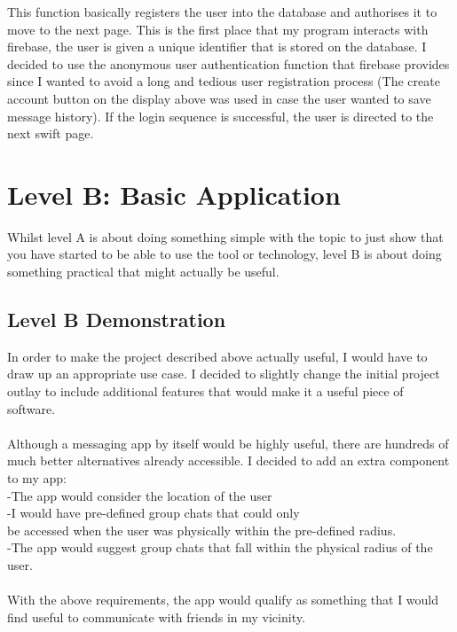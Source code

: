 \documentclass[a4paper, 11pt]{report}
\begin{document}
This function basically registers the user into the database and authorises it to move to the next page. This is the first place that my program interacts with firebase, the user is given a unique identifier that is stored on the database. I decided to use the anonymous user authentication function that firebase provides since I wanted to avoid a long and tedious user registration process (The create account button on the display above was used in case the user wanted to save message history). If the login sequence is successful, the user is directed to the next swift page.


\newpage
\section{Level B: Basic Application}

Whilst level A is about doing something simple with the topic to just show that you have started to be able to use the tool or technology, level B is about doing something practical that might actually be useful.

\subsection{Level B Demonstration}

In order to make the project described above actually useful, I would have to draw up an appropriate use case.  I decided to slightly change the initial project outlay to include additional features that would make it a useful piece of software. \\
\\
Although a messaging app by itself would be highly useful, there are hundreds of much better alternatives already accessible. I decided to add an extra component to my app:\\
-The app would consider the location of the user\\
-I would have pre-defined group chats that could only\\ be accessed when the user was physically within the pre-defined radius.\\
-The app would suggest group chats that fall within the physical radius of the user.\\
\\
With the above requirements, the app would qualify as something that I would find useful to communicate with friends in my vicinity.
\end{document}
